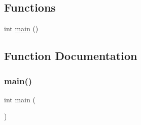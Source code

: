 \subsection*{Functions}
\begin{DoxyCompactItemize}
\item 
int \hyperlink{test-loader_8cpp_ae66f6b31b5ad750f1fe042a706a4e3d4}{main} ()
\end{DoxyCompactItemize}


\subsection{Function Documentation}
\hypertarget{test-loader_8cpp_ae66f6b31b5ad750f1fe042a706a4e3d4}{}\label{test-loader_8cpp_ae66f6b31b5ad750f1fe042a706a4e3d4} 
\subsubsection{\texorpdfstring{main()}{main()}}
{\footnotesize\ttfamily int main (\begin{DoxyParamCaption}{ }\end{DoxyParamCaption})}

